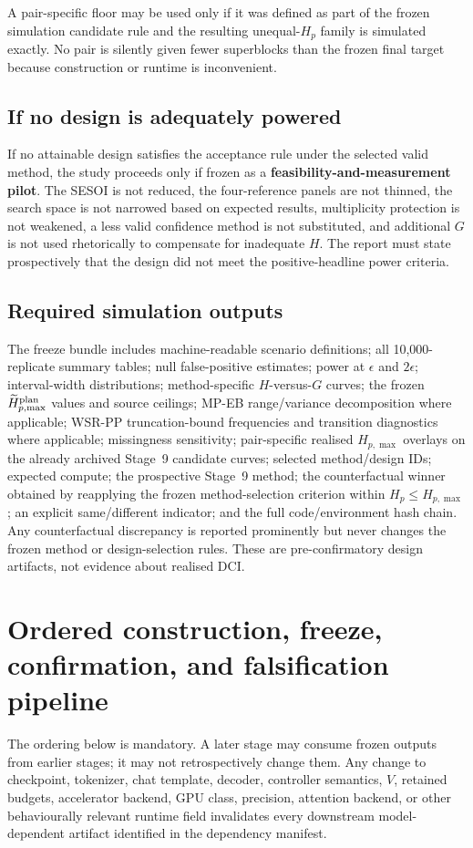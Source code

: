 \documentclass[11pt,a4paper]{article}
\begin{document}
A pair-specific floor may be used only if it was defined as part of the frozen simulation candidate rule and the resulting unequal-$H_p$ family is simulated exactly. No pair is silently given fewer superblocks than the frozen final target because construction or runtime is inconvenient.

\subsection{If no design is adequately powered}
If no attainable design satisfies the acceptance rule under the selected valid method, the study proceeds only if frozen as a \textbf{feasibility-and-measurement pilot}. The SESOI is not reduced, the four-reference panels are not thinned, the search space is not narrowed based on expected results, multiplicity protection is not weakened, a less valid confidence method is not substituted, and additional $G$ is not used rhetorically to compensate for inadequate $H$. The report must state prospectively that the design did not meet the positive-headline power criteria.

\subsection{Required simulation outputs}
The freeze bundle includes machine-readable scenario definitions; all 10,000-replicate summary tables; null false-positive estimates; power at $\epsilon$ and $2\epsilon$; interval-width distributions; method-specific $H$-versus-$G$ curves; the frozen $\widetilde H_{p,\max}^{\rm plan}$ values and source ceilings; MP-EB range/variance decomposition where applicable; WSR-PP truncation-bound frequencies and transition diagnostics where applicable; missingness sensitivity; pair-specific realised $H_{p,\max}$ overlays on the already archived Stage~9 candidate curves; selected method/design IDs; expected compute; the prospective Stage~9 method; the counterfactual winner obtained by reapplying the frozen method-selection criterion within $H_p\le H_{p,\max}$; an explicit same/different indicator; and the full code/environment hash chain. Any counterfactual discrepancy is reported prominently but never changes the frozen method or design-selection rules. These are pre-confirmatory design artifacts, not evidence about realised DCI.

\section{Ordered construction, freeze, confirmation, and falsification pipeline}\label{sec:stages}
The ordering below is mandatory. A later stage may consume frozen outputs from earlier stages; it may not retrospectively change them. Any change to checkpoint, tokenizer, chat template, decoder, controller semantics, $V$, retained budgets, accelerator backend, GPU class, precision, attention backend, or other behaviourally relevant runtime field invalidates every downstream model-dependent artifact identified in the dependency manifest.
\end{document}
